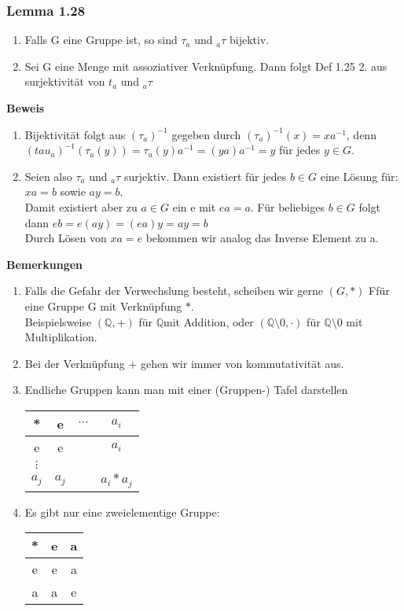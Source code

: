 \documentclass{scrartcl}
\newcommand{\Q}{\mathbb{Q}}
\newcommand{\mQ}{\(\mathbb{Q}\)}
\begin{document}
\subsubsection{Lemma 1.28}
\begin{enumerate}
\item{Falls G eine Gruppe ist, so sind \(\tau_a\) und \(_{a}\tau\) bijektiv.}
\item{Sei G eine Menge mit assoziativer Verkn\"upfung. Dann folgt Def 1.25 2. aus surjektivit\"at von \(t_a\) und \(_{a}\tau\)}
\end{enumerate}
\textbf{Beweis}\\
\begin{enumerate}
\item{
Bijektivit\"at folgt aus  \((\tau_a)^{-1}\) gegeben durch \((\tau_a)^{-1}(x) = x a^{-1}\), denn \((tau_a)^{-1}(\tau_a(y)) = \tau_a(y)a^{-1} = (y a) a^{-1} = y\) f\"ur jedes \(y \in G\).
}
\item{
 Seien also \(\tau_a\) und \(_{a}\tau\) surjektiv. Dann existiert f\"ur jedes \(b \in G\) eine L\"osung f\"ur:\\
 \(x a = b\) sowie \(a y = b\).\\
 Damit existiert aber zu \(a \in G\) ein  e mit \(ea = a\). F\"ur beliebiges \(b \in G\) folgt dann \(e b = e (a y) = (e a) y = ay = b\)\\
 Durch L\"osen von \(x a = e\) bekommen wir analog das Inverse Element zu a.
}
\end{enumerate}
\textbf{Bemerkungen}
\begin{enumerate}
\item{Falls die Gefahr der Verwechslung besteht, scheiben wir gerne \((G, *)\) Ff\"ur eine Gruppe G mit Verkn\"upfung \(*\).\\
Beispielsweise \((\Q, +)\) f\"ur \mQ mit Addition, oder \((\Q \setminus {0}, \cdot)\) f\"ur \(\Q \setminus {0}\) mit Multiplikation.\\}
\item{Bei der Verkn\"upfung + gehen wir immer von kommutativit\"at aus.}
\item{Endliche Gruppen kann man mit einer (Gruppen-) Tafel darstellen\\
\begin{tabular}{c || c | c | c}
* & e & \(\cdots\) & \(a_i\)\\
\hline
\hline
e & e &        & \(a_i\)\\
\hline
\(\vdots\) & & \\
\hline
\(a_j\) & \(a_j\)& & \(a_i * a_j\)
\end{tabular}
}
\item{
Es gibt nur eine zweielementige Gruppe:\\
\begin{tabular}{c || c | c}
* & e & a\\
\hline
\hline
e & e & a\\
\hline
a & a & e
\end{tabular}
}
\end{enumerate}
\end{document}
